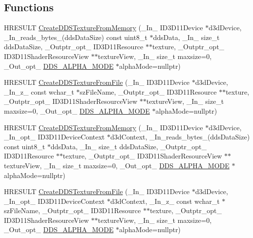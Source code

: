 \subsection*{Functions}
\begin{DoxyCompactItemize}
\item 
H\+R\+E\+S\+U\+LT \hyperlink{namespace_direct_x_a62a12ff7a57a36483e157b1fb1fe8dff}{Create\+D\+D\+S\+Texture\+From\+Memory} (\+\_\+\+In\+\_\+ I\+D3\+D11\+Device $\ast$d3d\+Device, \+\_\+\+In\+\_\+reads\+\_\+bytes\+\_\+(dds\+Data\+Size) const uint8\+\_\+t $\ast$dds\+Data, \+\_\+\+In\+\_\+ size\+\_\+t dds\+Data\+Size, \+\_\+\+Outptr\+\_\+opt\+\_\+ I\+D3\+D11\+Resource $\ast$$\ast$texture, \+\_\+\+Outptr\+\_\+opt\+\_\+ I\+D3\+D11\+Shader\+Resource\+View $\ast$$\ast$texture\+View, \+\_\+\+In\+\_\+ size\+\_\+t maxsize=0, \+\_\+\+Out\+\_\+opt\+\_\+ \hyperlink{namespace_direct_x_a7cb48689d75471680c0bf7f79caaaf1f}{D\+D\+S\+\_\+\+A\+L\+P\+H\+A\+\_\+\+M\+O\+DE} $\ast$alpha\+Mode=nullptr)
\item 
H\+R\+E\+S\+U\+LT \hyperlink{namespace_direct_x_a72103949d0a30b4d1cf2c68fb4d0ec19}{Create\+D\+D\+S\+Texture\+From\+File} (\+\_\+\+In\+\_\+ I\+D3\+D11\+Device $\ast$d3d\+Device, \+\_\+\+In\+\_\+z\+\_\+ const wchar\+\_\+t $\ast$sz\+File\+Name, \+\_\+\+Outptr\+\_\+opt\+\_\+ I\+D3\+D11\+Resource $\ast$$\ast$texture, \+\_\+\+Outptr\+\_\+opt\+\_\+ I\+D3\+D11\+Shader\+Resource\+View $\ast$$\ast$texture\+View, \+\_\+\+In\+\_\+ size\+\_\+t maxsize=0, \+\_\+\+Out\+\_\+opt\+\_\+ \hyperlink{namespace_direct_x_a7cb48689d75471680c0bf7f79caaaf1f}{D\+D\+S\+\_\+\+A\+L\+P\+H\+A\+\_\+\+M\+O\+DE} $\ast$alpha\+Mode=nullptr)
\item 
H\+R\+E\+S\+U\+LT \hyperlink{namespace_direct_x_a597be68a8cd5caf647a21e3d54230a91}{Create\+D\+D\+S\+Texture\+From\+Memory} (\+\_\+\+In\+\_\+ I\+D3\+D11\+Device $\ast$d3d\+Device, \+\_\+\+In\+\_\+opt\+\_\+ I\+D3\+D11\+Device\+Context $\ast$d3d\+Context, \+\_\+\+In\+\_\+reads\+\_\+bytes\+\_\+(dds\+Data\+Size) const uint8\+\_\+t $\ast$dds\+Data, \+\_\+\+In\+\_\+ size\+\_\+t dds\+Data\+Size, \+\_\+\+Outptr\+\_\+opt\+\_\+ I\+D3\+D11\+Resource $\ast$$\ast$texture, \+\_\+\+Outptr\+\_\+opt\+\_\+ I\+D3\+D11\+Shader\+Resource\+View $\ast$$\ast$texture\+View, \+\_\+\+In\+\_\+ size\+\_\+t maxsize=0, \+\_\+\+Out\+\_\+opt\+\_\+ \hyperlink{namespace_direct_x_a7cb48689d75471680c0bf7f79caaaf1f}{D\+D\+S\+\_\+\+A\+L\+P\+H\+A\+\_\+\+M\+O\+DE} $\ast$alpha\+Mode=nullptr)
\item 
H\+R\+E\+S\+U\+LT \hyperlink{namespace_direct_x_af625c91d9244b4829f140665e00acc57}{Create\+D\+D\+S\+Texture\+From\+File} (\+\_\+\+In\+\_\+ I\+D3\+D11\+Device $\ast$d3d\+Device, \+\_\+\+In\+\_\+opt\+\_\+ I\+D3\+D11\+Device\+Context $\ast$d3d\+Context, \+\_\+\+In\+\_\+z\+\_\+ const wchar\+\_\+t $\ast$sz\+File\+Name, \+\_\+\+Outptr\+\_\+opt\+\_\+ I\+D3\+D11\+Resource $\ast$$\ast$texture, \+\_\+\+Outptr\+\_\+opt\+\_\+ I\+D3\+D11\+Shader\+Resource\+View $\ast$$\ast$texture\+View, \+\_\+\+In\+\_\+ size\+\_\+t maxsize=0, \+\_\+\+Out\+\_\+opt\+\_\+ \hyperlink{namespace_direct_x_a7cb48689d75471680c0bf7f79caaaf1f}{D\+D\+S\+\_\+\+A\+L\+P\+H\+A\+\_\+\+M\+O\+DE} $\ast$alpha\+Mode=nullptr)

\end{DoxyCompactItemize}
